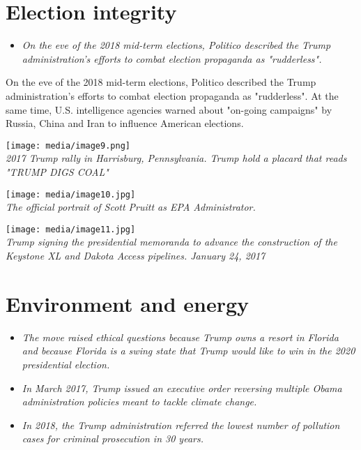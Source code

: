 \section{Election integrity}\label{election-integrity}

\begin{itemize}
\item
  \emph{On the eve of the 2018 mid-term elections, Politico described
  the Trump administration's efforts to combat election propaganda as
  "rudderless".}
\end{itemize}

On the eve of the 2018 mid-term elections, Politico described the Trump
administration's efforts to combat election propaganda as "rudderless".
At the same time, U.S. intelligence agencies warned about "on-going
campaigns" by Russia, China and Iran to influence American elections.

\texttt{[image: media/image9.png]}\\
\emph{2017 Trump rally in Harrisburg, Pennsylvania. Trump hold a placard
that reads "TRUMP DIGS COAL"}

\texttt{[image: media/image10.jpg]}\\
\emph{The official portrait of Scott Pruitt as EPA Administrator.}

\texttt{[image: media/image11.jpg]}\\
\emph{Trump signing the presidential memoranda to advance the
construction of the Keystone XL and Dakota Access pipelines. January 24,
2017}

\section{Environment and energy}\label{environment-and-energy}

\begin{itemize}
\item
  \emph{The move raised ethical questions because Trump owns a resort in
  Florida and because Florida is a swing state that Trump would like to
  win in the 2020 presidential election.}
\item
  \emph{In March 2017, Trump issued an executive order reversing
  multiple Obama administration policies meant to tackle climate
  change.}
\item
  \emph{In 2018, the Trump administration referred the lowest number of
  pollution cases for criminal prosecution in 30 years.}
\end{itemize}

